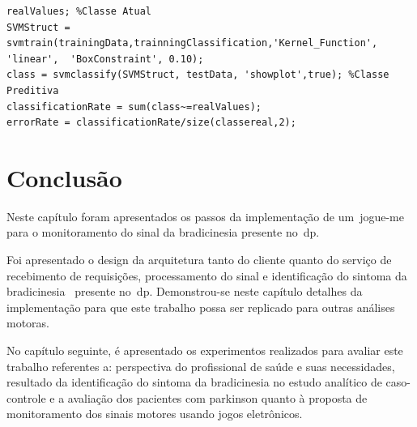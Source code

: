 \begin{lstlisting}[frame=single, caption=Uso da SVM para classificação dos dados, label=code:classification]
realValues; %Classe Atual
SVMStruct = svmtrain(trainingData,trainningClassification,'Kernel_Function', 'linear',	'BoxConstraint', 0.10);
class = svmclassify(SVMStruct, testData, 'showplot',true); %Classe Preditiva
classificationRate = sum(class~=realValues);
errorRate = classificationRate/size(classereal,2);
\end{lstlisting}

\section{Conclusão}
Neste capítulo foram apresentados os passos da implementação de um~\ac{jogue-me} para o monitoramento do sinal da bradicinesia presente no~\ac{dp}. 

Foi apresentado o design da arquitetura tanto do cliente quanto do serviço de recebimento de requisições, processamento do sinal e identificação do sintoma da bradicinesia~\cite{protpar010} presente no~\ac{dp}. Demonstrou-se neste capítulo detalhes da implementação para que este trabalho possa ser replicado para outras análises motoras.

No capítulo seguinte, é apresentado os experimentos realizados para avaliar este trabalho referentes a: perspectiva do profissional de saúde e suas necessidades, resultado da identificação do sintoma da bradicinesia no estudo analítico de caso-controle e a avaliação dos pacientes com parkinson quanto à proposta de monitoramento dos sinais motores usando jogos eletrônicos.


